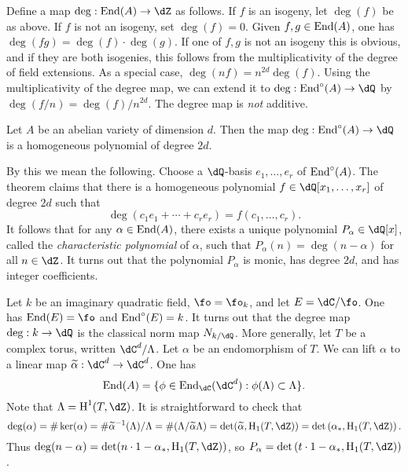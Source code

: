 \documentclass{article}
\begin{document}
Define a map $\deg:\End(A) \to \dZ$ as follows. If $f$ is an isogeny, let 
$\deg(f)$  be as above. If $f$ is not an isogeny, set $\deg(f)=0$. Given 
$f,g\in \operatorname{End}(A)$, one has $\deg(f g)=\deg(f)\cdot \deg(g)$. If one of $f,g$ is 
not an isogeny this is obvious, and if they are both isogenies, this follows 
from the multiplicativity of the degree of field extensions. As a special case, 
$\deg(n f)=n^{2 d}\deg(f)$. Using the multiplicativity of the degree map, we 
can extend it to $\deg:\End^\circ(A)\to \dQ$ by $\deg(f/n) = \deg(f)/n^{2 d}$. 
The degree map is \emph{not} additive. 

\begin{theorem}
Let $A$ be an abelian variety of dimension $d$. Then the map 
$\deg:\End^\circ(A) \to \dQ$ is a homogeneous polynomial of degree $2 d$. 
\end{theorem}

By this we mean the following. Choose a $\dQ$-basis $e_1,\dots,e_r$ of 
$\operatorname{End}^\circ(A)$. The theorem claims that there is a homogeneous polynomial 
$f\in \dQ[x_1,\dots,x_r]$ of degree $2 d$ such that 
\[
  \deg\left(c_1 e_1 + \cdots + c_r e_r\right) = f(c_1,\dots,c_r) \text{.}
\]
It follows that for any $\alpha\in \operatorname{End}(A)$, there exists a unique polynomial 
$P_\alpha\in \dQ[x]$, called the \emph{characteristic polynomial} of $\alpha$, 
such that $P_\alpha(n) = \deg(n-\alpha)$ for all $n\in \dZ$. It turns out that 
the polynomial $P_\alpha$ is monic, has degree $2 d$, and has integer 
coefficients. 

\begin{example}
Let $k$ be an imaginary quadratic field, $\fo=\fo_k$, and let 
$E=\dC/\fo$. One has $\End(E)=\fo$ and $\operatorname{End}^\circ(E)=k$. It turns out that the 
degree map $\deg:k\to \dQ$ is the classical norm map $N_{k/\dQ}$.
More generally, let $T$ be a complex torus, written $\dC^d/\Lambda$. Let 
$\alpha$ be an endomorphism of $T$. We can lift $\alpha$ to a linear map 
$\widetilde\alpha:\dC^d\to \dC^d$. One has 
\[
  \End(A) = \{\phi\in \End_\dC(\dC^d) : \phi(\Lambda)\subset \Lambda\} \text{.}
\]
Note that $\Lambda=\h^1(T,\dZ)$. It is straightforward to check that 
\[
  \deg(\alpha) 
    = \#\ker(\alpha) 
    = \#\widetilde \alpha^{-1}(\Lambda)/\Lambda 
    = \# (\Lambda/\widetilde\alpha\Lambda) 
    = \det(\widetilde\alpha,\h_1(T,\dZ)) 
    = \det\left(\alpha_\ast,\h_1(T,\dZ)\right) \text{.}
\]
Thus $\deg(n-\alpha)=\det(n\cdot 1-\alpha_\ast,\h_1(T,\dZ))$, so 
$P_\alpha=\det\left(t\cdot 1-\alpha_\ast,\h_1(T,\dZ)\right)$. 
\end{example}
\end{document}
